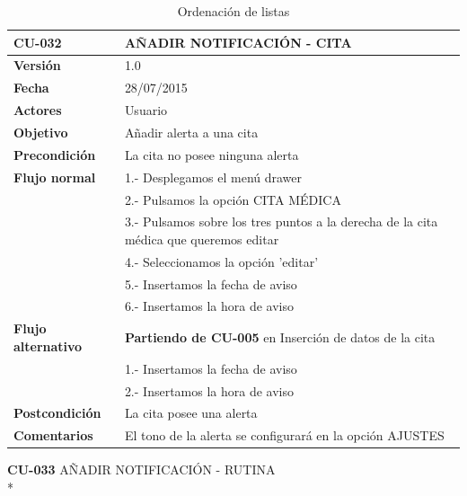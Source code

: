 \documentclass[../pfc.tex]{subfiles}
\begin{document}
	\begin{table}[H]
		\centering
		\begin{tabular}[t]{|p{3cm}|p{9.5cm}|}
			\hline \textbf{CU-032} & \textbf{AÑADIR NOTIFICACIÓN - CITA} \\*
			\hline\hline \textbf{Versión} & 1.0 \\*
			\hline\hline \textbf{Fecha} & 28/07/2015 \\*
			\hline\textbf{Actores} 	& Usuario\\*
			\hline \textbf{Objetivo} & Añadir alerta a una cita\\* 			
			\hline \textbf{Precondición} & La cita no posee ninguna alerta\\* 
			\hline \textbf{Flujo normal} & 1.- Desplegamos el menú drawer \\* 
			& 2.- Pulsamos la opción CITA MÉDICA\\*	
			& 3.- Pulsamos sobre los tres puntos a la derecha de la cita médica que queremos editar\\*	
			& 4.- Seleccionamos la opción 'editar'\\*	
			& 5.- Insertamos la fecha de aviso\\*
			& 6.- Insertamos la hora de aviso\\*
			\hline \textbf{Flujo alternativo} & \textbf{Partiendo de CU-005} en Inserción de datos de la cita\\*  
			& 1.- Insertamos la fecha de aviso\\*
			& 2.- Insertamos la hora de aviso\\*
			\hline \textbf{Postcondición} & La cita posee una alerta\\* 
			\hline \textbf{Comentarios}   & El tono de la alerta se configurará en la opción AJUSTES\\*
			\hline
		\end{tabular}
		\caption{Ordenación de listas}
		\label{tabla:caso032}
	\end{table}
	
	
	\textbf{CU-033}	AÑADIR NOTIFICACIÓN - RUTINA\\*
	
\end{document}
